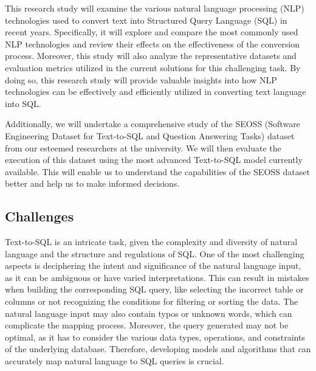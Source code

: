 This research study will examine the various natural language processing (NLP) technologies used to convert text into Structured Query Language (SQL) in recent years. Specifically, it will explore and compare the most commonly used NLP technologies and review their effects on the effectiveness of the conversion process. Moreover, this study will also analyze the representative datasets and evaluation metrics utilized in the current solutions for this challenging task. By doing so, this research study will provide valuable insights into how NLP technologies can be effectively and efficiently utilized in converting text language into SQL.

Additionally, we will undertake a comprehensive study of the SEOSS (Software Engineering Dataset for Text-to-SQL and Question Answering Tasks) dataset from our esteemed researchers at the university. We will then evaluate the execution of this dataset using the most advanced Text-to-SQL model currently available. This will enable us to understand the capabilities of the SEOSS dataset better and help us to make informed decisions.

\subsection{Challenges}

Text-to-SQL is an intricate task, given the complexity and diversity of natural language and the structure and regulations of SQL. One of the most challenging aspects is deciphering the intent and significance of the natural language input, as it can be ambiguous or have varied interpretations. This can result in mistakes when building the corresponding SQL query, like selecting the incorrect table or columns or not recognizing the conditions for filtering or sorting the data. The natural language input may also contain typos or unknown words, which can complicate the mapping process. Moreover, the query generated may not be optimal, as it has to consider the various data types, operations, and constraints of the underlying database. Therefore, developing models and algorithms that can accurately map natural language to SQL queries is crucial.

